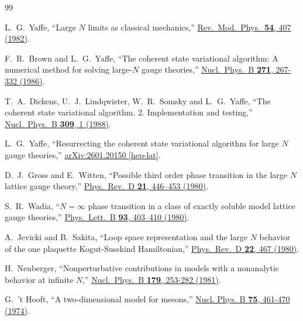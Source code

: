 \documentclass [12pt]{article}
\begin{document}
\begin{thebibliography}{99}

L.~G.~Yaffe,
``Large $N$ limits as classical mechanics,''
\href{https://doi.org/10.1103/RevModPhys.54.407}
{Rev.~Mod.~Phys.~\textbf{54}, 407 (1982)}.

F.~R.~Brown and L.~G.~Yaffe,
``The coherent state variational algorithm:
A numerical method for solving large-$N$ gauge theories,''
\href{https://doi.org/10.1016/0550-3213(86)90318-4}
{Nucl.~Phys.~B \textbf{271}, 267-332 (1986)}.

T.~A.~Dickens, U.~J.~Lindqwister, W.~R.~Somsky and L.~G.~Yaffe,
``The coherent state variational algorithm. 2. Implementation and testing,''
\href{https://doi.org/10.1016/0550-3213(88)90234-9}
{Nucl.~Phys.~B \textbf{309}, 1 (1988)}.

L.~G.~Yaffe,
``Resurrecting the coherent state variational algorithm for large $N$ gauge theories,''
\href{https://arxiv.org/abs/2601.20150}
{arXiv:2601.20150 [hep-lat]}.

D.~J.~Gross and E.~Witten,
``Possible third order phase transition in the large $N$ lattice gauge theory,''
\href{https://journals.aps.org/prd/abstract/10.1103/PhysRevD.21.446}
{Phys.~Rev.~D \textbf{21}, 446--453 (1980)}.

S.~R.~Wadia,
``$N = \infty$ phase transition in a class of exactly soluble model lattice gauge theories,''
\href{https://doi.org/10.1016/0370-2693(80)90353-6}
{Phys.~Lett.~B \textbf{93}, 403--410 (1980)}.

A.~Jevicki and B.~Sakita,
``Loop space representation and the large $N$ behavior of the one plaquette {Kogut-Susskind} Hamiltonian,''
\href{https://doi.org/10.1103/PhysRevD.22.467}
{Phys.~Rev.~D \textbf{22}, 467 (1980)}.

H.~Neuberger,
``Nonperturbative contributions in models with a nonanalytic behavior at infinite $N$,''
\href{https://doi.org/10.1016/0550-3213(81)90238-8}
{Nucl.~Phys.~B \textbf{179}, 253-282 (1981)}.

G.~'t Hooft,
``A two-dimensional model for mesons,''
\href{https://doi.org/10.1016/0550-3213(74)90088-1}
{Nucl. Phys. B \textbf{75}, 461-470 (1974)}.

\end{thebibliography}
\end{document}
